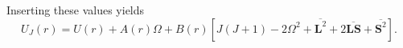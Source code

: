 Inserting these values yields
\[U_J(r)=U(r)+A(r)\Omega+B(r)[J(J+1)-2\Omega^2+\overline{\mathbf L^2}+2\overline{\mathbf{LS}}+\overline{\mathbf S^2}].\]
